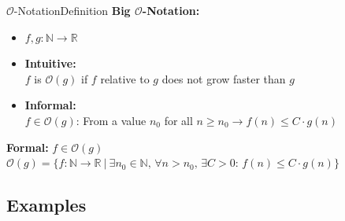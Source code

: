 
\begin{frame}{$\mathcal{O}$-Notation}{Definition}
  \textbf{Big $\mathcal{O}$-Notation:}
  \begin{itemize}
    \item
      $f,g\!: \mathbb{N} \to \mathbb{R}$
    \item
      \textbf{Intuitive:}\\
      $f$ is $\mathcal{O}(g)$ if $f$ relative to $g$ does not grow faster than 
      $g$
    \item 
      \textbf{Informal:}\\ 
      $f \in \mathcal O(g)$: From a value $n_0$ for all
      $n \geq n_0 \rightarrow f(n) \leq C \cdot g(n)$
  \end{itemize}
  \begin{block}{\textbf{Formal:} $f \in \mathcal O(g)$}
    \begin{math}
      \mathcal O(g) = \lbrace f: \mathbb{N} \to \mathbb{R} ~ | ~
        \exists n_0 \in \mathbb{N}, \, \forall n > n_0, \, \exists C > 0: \,
        f(n) \leq C \cdot g(n)\rbrace
    \end{math}
  \end{block}
\end{frame}


\subsection{Examples}

